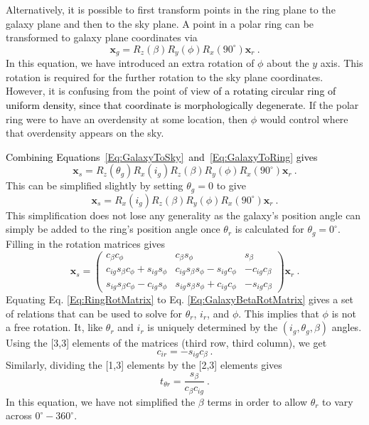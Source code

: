 \documentclass[fleqn,usenatbib]{mnras}
\newcommand{\KS}[1]{\textcolor{black}{#1}}
\begin{document}
Alternatively, it is possible to first transform points in the ring plane to the galaxy plane and then to the sky plane.  A point in a polar ring can be transformed to galaxy plane coordinates via
\begin{equation}
    \mathbf{x}_{g}=R_{z}(\beta)R_{y}(\phi)R_{x}(90^{\circ})\mathbf{x}_{r}~.
    \label{Eq:GalaxyToRing}
\end{equation}
In this equation, we have introduced an extra rotation of $\phi$ about the $y$ axis.  This rotation is required for the further rotation to the sky plane coordinates.  However, it is confusing from the point of view \KS{of a rotating circular ring of uniform density, since that coordinate is morphologically degenerate}.  If the polar ring were to have an overdensity at some location, then $\phi$ would control where that overdensity appears on the sky.  

\KS{Combining Equations~\ref{Eq:GalaxyToSky}~and~\ref{Eq:GalaxyToRing} gives}
\begin{equation}
    \mathbf{x}_{s}=R_{z}(\theta_{g})R_{x}(i_{g}) R_{z}(\beta)R_{y}(\phi)R_{x}(90^{\circ})\mathbf{x}_{r}~.
\end{equation}
This can be simplified slightly by setting $\theta_{g}=0$ to give
\begin{equation}
    \mathbf{x}_{s}=R_{x}(i_{g}) R_{z}(\beta)R_{y}(\phi)R_{x}(90^{\circ})\mathbf{x}_{r}~.
\end{equation}
This simplification does not lose any generality as the galaxy's position angle can simply be added to the ring's position angle once $\theta_{r}$ is calculated for $\theta_{g}=0^{\circ}$.  Filling in the rotation matrices gives
\begin{equation}
    \mathbf{x}_{s}=
    \left(
    \begin{matrix}
    c_{\beta}c_{\phi} & c_{\beta}s_{\phi} & s_{\beta}\\
   c_{ig}s_{\beta}c_{\phi}+s_{ig}s_{\phi} & c_{ig}s_{\beta}s_{\phi} -s_{ig}c_{\phi} & -c_{ig}c_{\beta}\\
    s_{ig}s_{\beta}c_{\phi}-c_{ig}s_{\phi} &s_{ig}s_{\beta}s_{\phi} +c_{ig}c_{\phi} & -s_{ig}c_{\beta}
    \end{matrix}
    \right)
    \mathbf{x}_{r}~.
    \label{Eq:GalaxyBetaRotMatrix}
\end{equation}
Equating Eq. \ref{Eq:RingRotMatrix} to Eq. \ref{Eq:GalaxyBetaRotMatrix} gives a set of relations that can be used to solve for $\theta_{r}$, $i_{r}$, and $\phi$.  This implies that $\phi$ is not a free rotation.  It, like $\theta_{r}$ and $i_{r}$ is uniquely determined by the $(i_{g},\theta_{g},\beta)$ angles.  Using the [3,3] elements of the matrices (third row, third column), we get
\begin{equation}
    c_{ir}=-s_{ig}c_{\beta}~.
\end{equation}
Similarly, dividing the [1,3] elements by the [2,3] elements gives
\begin{equation}
    t_{\theta r}=\frac{s_{\beta}}{c_{\beta}c_{ig}}~.
\end{equation}
In this equation, we have not simplified the $\beta$ terms in order to allow $\theta_{r}$ to vary across $0^{\circ}-360^{\circ}$. 
\end{document}
